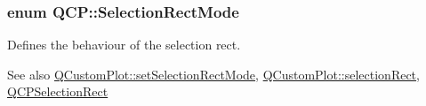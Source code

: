 \subsubsection[{\texorpdfstring{Selection\+Rect\+Mode}{SelectionRectMode}}]{\setlength{\rightskip}{0pt plus 5cm}enum {\bf Q\+C\+P\+::\+Selection\+Rect\+Mode}}\hypertarget{namespace_q_c_p_ac9aa4d6d81ac76b094f9af9ad2d3aacf}{}\label{namespace_q_c_p_ac9aa4d6d81ac76b094f9af9ad2d3aacf}
Defines the behaviour of the selection rect.

\begin{DoxySeeAlso}{See also}
\hyperlink{class_q_custom_plot_a810ef958ebe84db661c7288b526c0deb}{Q\+Custom\+Plot\+::set\+Selection\+Rect\+Mode}, \hyperlink{class_q_custom_plot_ae64a3994735d8f592a60d9430526a163}{Q\+Custom\+Plot\+::selection\+Rect}, \hyperlink{class_q_c_p_selection_rect}{Q\+C\+P\+Selection\+Rect} 
\end{DoxySeeAlso}
